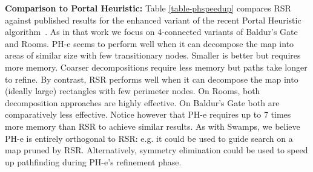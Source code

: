\textbf{Comparison to Portal Heuristic:}
Table \ref{table-phspeedup} compares RSR against published results for the enhanced variant of the
recent Portal Heuristic algorithm~\cite{goldenberg10}.  As in that work we focus
on 4-connected variants of Baldur's Gate and Rooms.
PH-e seems to perform well when it can decompose the map into areas of similar 
size with few transitionary nodes. Smaller is better but requires
more memory. Coarser decompositions require less memory but paths take longer
to refine. 
By contrast, RSR performs well when it can decompose the map into (ideally large) 
rectangles with few perimeter nodes.
On Rooms, both decomposition approaches are highly effective. 
On Baldur's Gate both are comparatively less effective.
Notice however that PH-e requires up to 7 times more memory than RSR to achieve
similar results.
As with Swamps, we believe PH-e is entirely orthogonal to RSR: e.g.
it could be used to guide search on a map pruned by RSR. Alternatively, 
symmetry elimination could be used to speed up pathfinding during PH-e's refinement phase.

